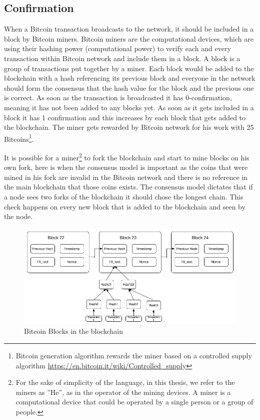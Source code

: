 \subsection{Confirmation}
When a Bitcoin transaction broadcasts to the network, it should be included in a block by Bitcoin miners. Bitcoin miners are the computational devices, which are using their hashing power (computational power) to verify each and every transaction within Bitcoin network and include them in a block. A block is a group of transactions put together by a miner. Each block would be added to the blockchain with a hash referencing its previous block and everyone in the network should form the consensus that the hash value for the block and the previous one is correct. As soon as the transaction is broadcasted it has 0-confirmation, meaning it has not been added to any blocks yet. As soon as it gets included in a block it has 1 confirmation and this increases by each block that gets added to the blockchain. The miner gets rewarded by Bitcoin network for his work with 25 Bitcoins\footnote{Bitcoin generation algorithm rewards the miner based on a controlled supply algorithm \url{https://en.bitcoin.it/wiki/Controlled_supply}}.

It is possible for a miner\footnote{For the sake of simplicity of the language, in this thesis, we refer to the miners as ''He'', as in the operator of the mining devices. A miner is a computational device that could be operated by a single person or a group of people.} to fork the blockchain and start to mine blocks on his own fork, here is when the consensus model is important as the coins that were mined in his fork are invalid in the Bitcoin network and there is no reference in the main blockchain that those coins exists. The consensus model dictates that if a node sees two forks of the blockchain it should chose the longest chain. This check happens on every new block that is added to the blockchain and seen by the node.

\begin{figure}
\centering
\includegraphics[width=\linewidth]{fig/Bitcoinblocks.png}
  \caption{Bitcoin Blocks in the blockchain ~\cite{Nak08}}
\label{fig:Bitcoinblocks}
\end{figure}

